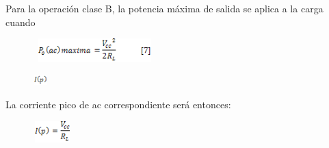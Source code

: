 \documentclass[12pt]{article}
\begin{document}
Para la operación clase B, la potencia máxima de salida se aplica a la carga cuando \par




\begin{figure}[H]
	\begin{Center}
		\includegraphics[width=1.89in,height=0.36in]{./media/image29.gif}
	\end{Center}
\end{figure}



\par




\begin{figure}[H]
	\begin{Center}
		\includegraphics[width=0.24in,height=0.15in]{./media/image30.gif}
	\end{Center}
\end{figure}



La corriente pico de ac correspondiente será entonces:\par




\begin{figure}[H]
	\begin{Center}
		\includegraphics[width=0.59in,height=0.33in]{./media/image31.gif}
	\end{Center}
\end{figure}


\end{document}

